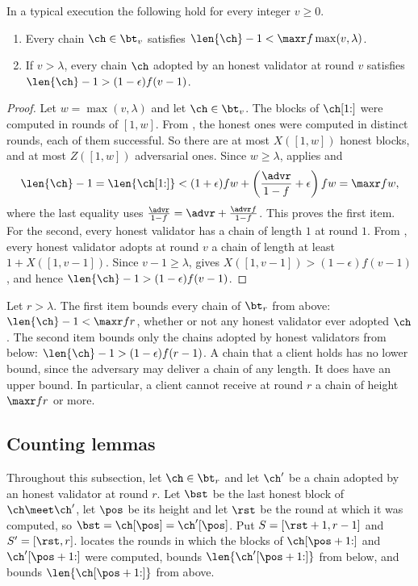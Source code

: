 \begin{lemma}\label{lem.length}
    In a typical execution the following hold for every integer $v\ge0$.
    \begin{enumerate}
        \item Every chain $\ch\in\bt_v$ satisfies
            $\len{\ch}-1<\maxr f\max(v,\lambda)$.
        \item If $v>\lambda$, every chain $\ch$ adopted by an honest validator
            at round $v$ satisfies $\len{\ch}-1>(1-\epsilon)f(v-1)$.
    \end{enumerate}
\end{lemma}
\begin{proof}
    Let $w=\max(v,\lambda)$ and let $\ch\in\bt_v$. The blocks of $\ch[1{:}]$
    were computed in rounds of $[1,w]$. From , the honest
    ones were computed in distinct rounds, each of them successful. So there
    are at most $X([1,w])$ honest blocks, and at most $Z([1,w])$ adversarial
    ones. Since $w\ge\lambda$,  applies and
    \[
        \len{\ch}-1 = \len{\ch[1{:}]} <
            (1+\epsilon)fw+\left(\frac{\advr}{1-f}+\epsilon\right)fw = \maxr f w,
    \]
    where the last equality uses $\frac{\advr}{1-f}=\advr+\frac{\advr f}{1-f}$.
    This proves the first item. For the second, every honest validator has a
    chain of length $1$ at round $1$. From , every honest
    validator adopts at round $v$ a chain of length at least $1+X([1,v-1])$.
    Since $v-1\ge\lambda$,  gives $X([1,v-1])>(1-\epsilon)f(v-1)$,
    and hence $\len{\ch}-1>(1-\epsilon)f(v-1)$.
\end{proof}

Let $r>\lambda$. The first item bounds every chain of $\bt_r$ from above:
$\len{\ch}-1<\maxr fr$, whether or not any honest validator ever adopted $\ch$.
The second item bounds only the chains adopted by honest validators from below:
$\len{\ch}-1>(1-\epsilon)f(r-1)$. A chain that a client holds has no lower
bound, since the adversary may deliver a chain of any length. It does have an
upper bound. In particular, a client cannot receive at round $r$ a chain of
height $\maxr fr$ or more.

\subsection{Counting lemmas}
\label{sec.counting}

Throughout this subsection, let
$\ch\in\bt_r$ and let $\ch'$ be a chain adopted by an honest validator at round
$r$. Let $\bst$ be the last honest block of $\ch\meet\ch'$, let $\pos$ be its
height and let $\rst$ be the round at which it was computed, so
$\bst=\ch[\pos]=\ch'[\pos]$. Put $S=[\rst+1,r-1]$ and $S'=[\rst,r]$.
 locates the rounds in which the blocks of $\ch[\pos+1{:}]$
and $\ch'[\pos+1{:}]$ were computed,  bounds
$\len{\ch'[\pos+1{:}]}$ from below, and  bounds
$\len{\ch[\pos+1{:}]}$ from above.

